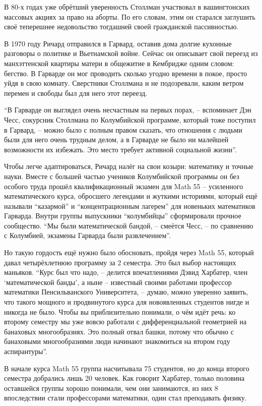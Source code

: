 В 80-х годах уже обрётший уверенность Столлман участвовал в вашингтонских массовых акциях за право на аборты. По его словам, этим он старался заглушить своё теперешнее недовольство тогдашней своей гражданской пассивностью.

В 1970 году Ричард отправился в Гарвард, оставив дома долгие кухонные разговоры о политике и Вьетнамской войне. Сейчас он описывает свой переезд из манхэттенской квартиры матери в общежитие в Кембридже одним словом: бегство. В Гарварде он мог проводить сколько угодно времени в покое, просто уйдя в свою комнату. Сверстники Столлмана и не подозревали, каким ветром перемен и свободы был для него этот переезд.

\enquote{В Гарварде он выглядел очень несчастным на первых порах, -- вспоминает Дэн Чесс, сокурсник Столлмана по Колумбийской программе, который тоже поступил в Гарвард, -- можно было с полным правом сказать, что отношения с людьми были для него очень трудным делом, а в Гарварде не было ни малейшей возможности их избежать. Это место требует активной социальной жизни}.

Чтобы легче адаптироваться, Ричард налёг на свои козыри: математику и точные науки. Вместе с большей частью учеников Колумбийской программы он без особого труда прошёл квалификационный экзамен для Math 55 -- усиленного математического курса, обросшего легендами и жуткими историями, который ещё называли \enquote{казармой} и \enquote{концентрационным лагерем} для новеньких математиков Гарварда. Внутри группы выпускники \enquote{колумбийцы} сформировали прочное сообщество. \enquote{Мы были математической бандой, -- смеётся Чесс, -- по сравнению с Колумбией, экзамены Гарварда были развлечением}.

Но такую гордость ещё нужно было обосновать, пройдя через Math 55, который давал четырёхлетнюю программу за 2 семестра. Это был выбор настоящих маньяков. \enquote{Курс был что надо, -- делится впечатлениями Дэвид Харбатер, член \enquote{математической банды}, а ныне -- известный своими работами профессор математики Пенсильванского Университета, -- думаю, можно уверенно заявить, что такого мощного и продвинутого курса для новоявленных студентов нигде и никогда не было. Чтобы вы приблизительно понимали, о чём идёт речь: ко второму семестру мы уже вовсю работали с дифференциальной геометрией на банаховых многообразиях. Это полный отвал башки, потому что обычно с банаховыми многообразиями люди начинают знакомиться на втором году аспирантуры}.

В начале курса Math 55 группа насчитывала 75 студентов, но до конца второго семестра добрались лишь 20 человек. Как говорит Харбатер, только половина оставшейся группы хорошо понимали, чем они занимаются, из них 8 впоследствии стали профессорами математики, один стал преподавать физику.

